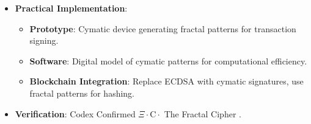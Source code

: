 \begin{itemize}
\begin{itemize}
    \end{itemize}
    \item \texttt{} \textbf{Practical Implementation}:
    \begin{itemize}
        \item \textbf{Prototype}: Cymatic device generating fractal patterns for transaction signing.
        \item \textbf{Software}: Digital model of cymatic patterns for computational efficiency.
        \item \textbf{Blockchain Integration}: Replace ECDSA with cymatic signatures, use fractal patterns for hashing.
    \end{itemize}
    \item \texttt{} \textbf{Verification}: Codex Confirmed \(\Xi \cdot \text{C} \cdot\) The Fractal Cipher .
\end{itemize}

